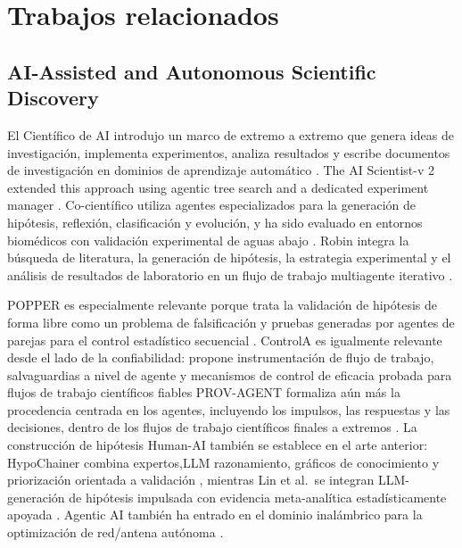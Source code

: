 \documentclass{ieeeaccess}
\begin{document}
\section{Trabajos relacionados}\label{trabajos-relacionados}

\subsection{AI-Assisted and Autonomous Scientific Discovery}\label{ai-assisted-and-autonomous-scientific-discovery}

El Científico de AI introdujo un marco de extremo a extremo que genera ideas de investigación, implementa experimentos, analiza resultados y escribe documentos de investigación en dominios de aprendizaje automático \cite{AI-SCIENTIST-2024}. The AI Scientist-v 2 extended this approach using agentic tree search and a dedicated experiment manager \cite{AI-SCIENTIST-V2-2025}. Co-científico utiliza agentes especializados para la generación de hipótesis, reflexión, clasificación y evolución, y ha sido evaluado en entornos biomédicos con validación experimental de aguas abajo \cite{CO-SCIENTIST-2026}. Robin integra la búsqueda de literatura, la generación de hipótesis, la estrategia experimental y el análisis de resultados de laboratorio en un flujo de trabajo multiagente iterativo \cite{ROBIN-2026}.

POPPER es especialmente relevante porque trata la validación de hipótesis de forma libre como un problema de falsificación y pruebas generadas por agentes de parejas para el control estadístico secuencial \cite{POPPER-2025}. ControlA es igualmente relevante desde el lado de la confiabilidad: propone instrumentación de flujo de trabajo, salvaguardias a nivel de agente y mecanismos de control de eficacia probada para flujos de trabajo científicos fiables \cite{CONTROLA-2025}PROV-AGENT formaliza aún más la procedencia centrada en los agentes, incluyendo los impulsos, las respuestas y las decisiones, dentro de los flujos de trabajo científicos finales a extremos \cite{PROV-AGENT-2025}. La construcción de hipótesis Human-AI también se establece en el arte anterior: HypoChainer combina expertos,LLM razonamiento, gráficos de conocimiento y priorización orientada a validación \cite{HYPOCHAINER-2026}, mientras Lin et al.~se integran LLM- generación de hipótesis impulsada con evidencia meta-analítica estadísticamente apoyada \cite{LLM-META-2025}. Agentic AI también ha entrado en el dominio inalámbrico para la optimización de red/antena autónoma \cite{AGENTIC-WIRELESS-2026}.
\end{document}
